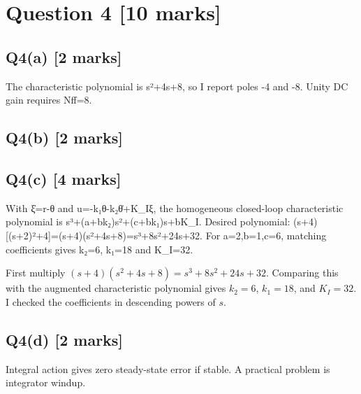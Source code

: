 \documentclass[11pt,a4paper]{article}
\begin{document}
\vspace{2mm}

\section*{Question 4 \hfill [10 marks]}
\subsection*{Q4(a) \hfill [2 marks]}

The characteristic polynomial is s²+4s+8, so I report poles -4 and -8.
Unity DC gain requires Nff=8.

\subsection*{Q4(b) \hfill [2 marks]}

\vspace{2mm}

\subsection*{Q4(c) \hfill [4 marks]}

With ξ̇=r-θ and u=-k₁θ-k₂θ̇+K\_Iξ, the homogeneous closed-loop characteristic polynomial is s³+(a+bk₂)s²+(c+bk₁)s+bK\_I.
Desired polynomial: (s+4)[(s+2)²+4]=(s+4)(s²+4s+8)=s³+8s²+24s+32.
For a=2,b=1,c=6, matching coefficients gives k₂=6, k₁=18 and K\_I=32.\par\smallskip First multiply $(s+4)(s^2+4s+8)=s^3+8s^2+24s+32$. Comparing this with the augmented characteristic polynomial gives $k_2=6$, $k_1=18$, and $K_I=32$. I checked the coefficients in descending powers of $s$.

\subsection*{Q4(d) \hfill [2 marks]}

Integral action gives zero steady-state error if stable.
A practical problem is integrator windup.
\end{document}
